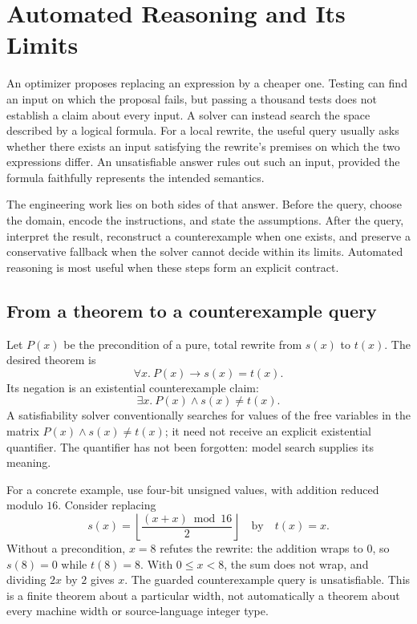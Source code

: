 \chapter{Automated Reasoning and Its Limits}
\label{ch:automated-reasoning-limits}

An optimizer proposes replacing an expression by a cheaper one.
Testing can find an input on which the proposal fails, but passing a thousand tests does not establish a claim about every input.
A solver can instead search the space described by a logical formula.
For a local rewrite, the useful query usually asks whether there exists an input satisfying the rewrite's premises on which the two expressions differ.
An unsatisfiable answer rules out such an input, provided the formula faithfully represents the intended semantics.

The engineering work lies on both sides of that answer.
Before the query, choose the domain, encode the instructions, and state the assumptions.
After the query, interpret the result, reconstruct a counterexample when one exists, and preserve a conservative fallback when the solver cannot decide within its limits.
Automated reasoning is most useful when these steps form an explicit contract.

\section{From a theorem to a counterexample query}
\label{sec:ch41-query}

Let $P(x)$ be the precondition of a pure, total rewrite from $s(x)$ to $t(x)$.
The desired theorem is
\[
  \forall x.\ P(x)\rightarrow s(x)=t(x).
\]
Its negation is an existential counterexample claim:
\[
  \exists x.\ P(x)\land s(x)\neq t(x).
\]
A satisfiability solver conventionally searches for values of the free variables in the matrix $P(x)\land s(x)\neq t(x)$; it need not receive an explicit existential quantifier.
The quantifier has not been forgotten: model search supplies its meaning.

For a concrete example, use four-bit unsigned values, with addition reduced modulo $16$.
Consider replacing
\[
 s(x)=\left\lfloor\frac{(x+x)\bmod16}{2}\right\rfloor
 \quad\text{by}\quad t(x)=x.
\]
Without a precondition, $x=8$ refutes the rewrite: the addition wraps to $0$, so $s(8)=0$ while $t(8)=8$.
With $0\leq x<8$, the sum does not wrap, and dividing $2x$ by $2$ gives $x$.
The guarded counterexample query is unsatisfiable.
This is a finite theorem about a particular width, not automatically a theorem about every machine width or source-language integer type.

